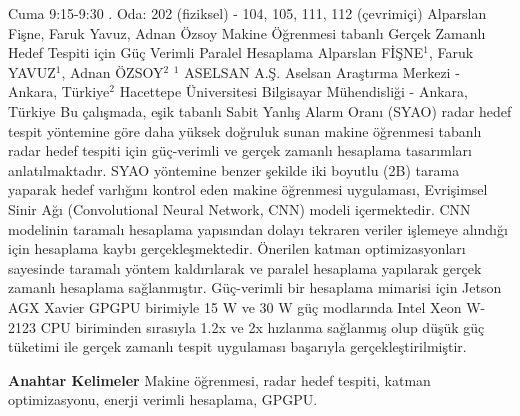 
    \begin{abstract_basarim}
    {Cuma 9:15-9:30}
    {.}
    {Oda: 202 (fiziksel) - 104, 105, 111, 112 (çevrimiçi)}
    {Alparslan Fişne, Faruk Yavuz, Adnan Özsoy}
    {Makine Öğrenmesi tabanlı Gerçek Zamanlı Hedef Tespiti için Güç Verimli Paralel Hesaplama}
    {%
    Alparslan FİŞNE$^{1}$, Faruk YAVUZ$^{1}$, Adnan ÖZSOY$^{2}$}
    {%
    }
    {%
    $^1$ ASELSAN A.Ş. Aselsan Araştırma Merkezi - Ankara, Türkiye\newline{}$^2$ Hacettepe Üniversitesi Bilgisayar Mühendisliği - Ankara, Türkiye}
    Bu çalışmada, eşik tabanlı Sabit Yanlış Alarm Oranı (SYAO) radar hedef tespit yöntemine göre daha yüksek doğruluk sunan makine öğrenmesi tabanlı radar hedef tespiti için güç-verimli ve gerçek zamanlı hesaplama tasarımları anlatılmaktadır. SYAO yöntemine benzer şekilde iki boyutlu (2B) tarama yaparak hedef varlığını kontrol eden makine öğrenmesi uygulaması, Evrişimsel Sinir Ağı (Convolutional Neural Network, CNN) modeli içermektedir. CNN modelinin taramalı hesaplama yapısından dolayı tekraren veriler işlemeye alındığı için hesaplama kaybı gerçekleşmektedir. Önerilen katman optimizasyonları sayesinde taramalı yöntem kaldırılarak ve paralel hesaplama yapılarak gerçek zamanlı hesaplama sağlanmıştır. Güç-verimli bir hesaplama mimarisi için Jetson AGX Xavier GPGPU birimiyle 15 W ve 30 W güç modlarında Intel Xeon W-2123 CPU biriminden sırasıyla 1.2x ve 2x hızlanma sağlanmış olup düşük güç tüketimi ile gerçek zamanlı tespit uygulaması başarıyla gerçekleştirilmiştir. 
    
            \textbf{Anahtar Kelimeler} \newline{}Makine öğrenmesi, radar hedef tespiti, katman optimizasyonu, enerji verimli hesaplama, GPGPU.
    \end{abstract_basarim}
    